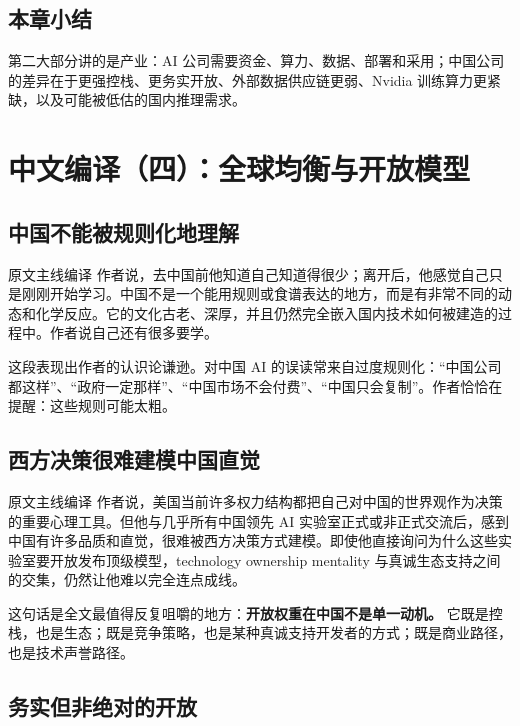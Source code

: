 \documentclass[a4paper]{article}
\begin{document}
\subsection{本章小结}

第二大部分讲的是产业：AI 公司需要资金、算力、数据、部署和采用；中国公司的差异在于更强控栈、更务实开放、外部数据供应链更弱、Nvidia 训练算力更紧缺，以及可能被低估的国内推理需求。


\section{中文编译（四）：全球均衡与开放模型}

\subsection{中国不能被规则化地理解}

\begin{translationbox}{原文主线编译}
作者说，去中国前他知道自己知道得很少；离开后，他感觉自己只是刚刚开始学习。中国不是一个能用规则或食谱表达的地方，而是有非常不同的动态和化学反应。它的文化古老、深厚，并且仍然完全嵌入国内技术如何被建造的过程中。作者说自己还有很多要学。
\end{translationbox}

这段表现出作者的认识论谦逊。对中国 AI 的误读常来自过度规则化：``中国公司都这样''、``政府一定那样''、``中国市场不会付费''、``中国只会复制''。作者恰恰在提醒：这些规则可能太粗。

\subsection{西方决策很难建模中国直觉}

\begin{translationbox}{原文主线编译}
作者说，美国当前许多权力结构都把自己对中国的世界观作为决策的重要心理工具。但他与几乎所有中国领先 AI 实验室正式或非正式交流后，感到中国有许多品质和直觉，很难被西方决策方式建模。即使他直接询问为什么这些实验室要开放发布顶级模型，technology ownership mentality 与真诚生态支持之间的交集，仍然让他难以完全连点成线。
\end{translationbox}

这句话是全文最值得反复咀嚼的地方：\textbf{开放权重在中国不是单一动机。} 它既是控栈，也是生态；既是竞争策略，也是某种真诚支持开发者的方式；既是商业路径，也是技术声誉路径。

\subsection{务实但非绝对的开放}
\end{document}
